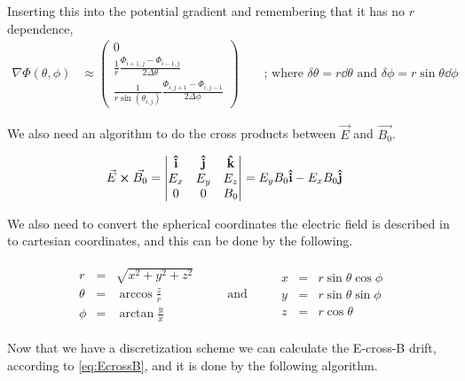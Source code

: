 \documentclass[x11names]{article}
\renewcommand{\va}{\vec}
\begin{document}
    Inserting this into the potential gradient and remembering that it has no \(r\) dependence,
    \begin{align}
      \nabla \Phi(\theta,\phi) &\approx
      \begin{pmatrix}
        0
        \\
        \frac{1}{r} \frac{ \Phi_{i+1, j} - \Phi_{i - 1, j} }{2 \Delta \theta}
        \\
        \frac{1}{r\sin(\theta_{i,j})}  \frac{ \Phi_{i, j + 1} - \Phi_{i , j - 1} }{2\Delta \phi}
      \end{pmatrix} \label{eq:discretization}
      \qquad{} \text{; where }  \delta \theta = r\dd{\theta} \text{ and } \delta \phi = r \sin{\theta} \dd \phi 
    \end{align}

    We also need an algorithm to do the cross products between \(\va{E}\) and \(\va{B_0}\).

    \begin{align}
      \va{E} \cross \va{B_0} &= 
      \begin{vmatrix}
        \vu{i} & \vu{j} &\vu{k}
        \\
        E_x & E_y & E_z
        \\
        0 & 0 & B_0
      \end{vmatrix}
      = E_yB_0\vu{i} - E_x B_0 \vu{j}
    \end{align}

    We also need to convert the spherical coordinates the electric field is described in to cartesian coordinates, and this can be done by the following.

    \begin{align}
      \begin{matrix}
        r &=& \sqrt{x^2 + y^2 + z^2}
        \\
        \theta&=&   \arccos{\frac{z}{r}}
        \\
        \phi &=& \arctan{\frac{y}{x}}
      \end{matrix}  
    \qquad \text{ and } \qquad
      \begin{matrix}
        x &=& r\sin{\theta}\cos{\phi}
        \\
        y &=& r\sin{\theta}\sin{\phi}
        \\
        z &=& r\cos{\theta}
      \end{matrix}  
    \end{align}

    Now that we have a discretization scheme we can calculate the E-cross-B drift, according to \cref{eq:EcrossB}, and it is done by the following algorithm.
\end{document}
